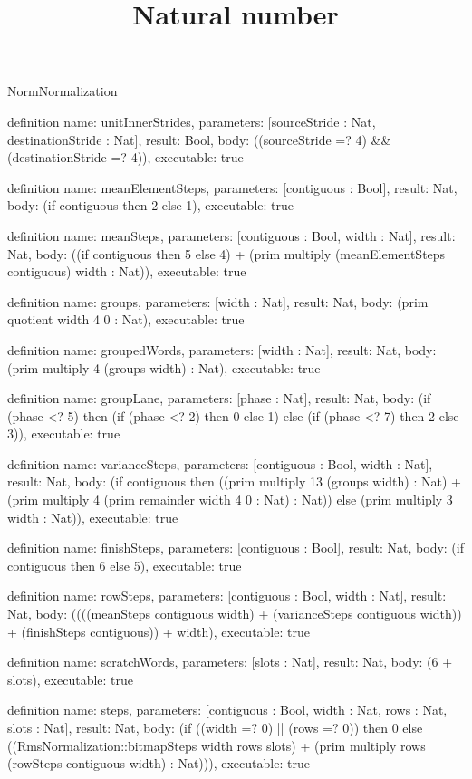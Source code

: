 \begin{lexlean}{NormNormalization}
\title{Natural number}
\begin{semanticmodule}
definition{
  name: unitInnerStrides,
  parameters: [sourceStride : Nat, destinationStride : Nat],
  result: Bool,
  body: ((sourceStride =? 4) && (destinationStride =? 4)),
  executable: true
}

definition{
  name: meanElementSteps,
  parameters: [contiguous : Bool],
  result: Nat,
  body: (if contiguous then 2 else 1),
  executable: true
}

definition{
  name: meanSteps,
  parameters: [contiguous : Bool, width : Nat],
  result: Nat,
  body: ((if contiguous then 5 else 4) + (prim multiply (meanElementSteps contiguous) width : Nat)),
  executable: true
}

definition{
  name: groups,
  parameters: [width : Nat],
  result: Nat,
  body: (prim quotient width 4 0 : Nat),
  executable: true
}

definition{
  name: groupedWords,
  parameters: [width : Nat],
  result: Nat,
  body: (prim multiply 4 (groups width) : Nat),
  executable: true
}

definition{
  name: groupLane,
  parameters: [phase : Nat],
  result: Nat,
  body: (if (phase <? 5) then (if (phase <? 2) then 0 else 1) else (if (phase <? 7) then 2 else 3)),
  executable: true
}

definition{
  name: varianceSteps,
  parameters: [contiguous : Bool, width : Nat],
  result: Nat,
  body: (if contiguous then ((prim multiply 13 (groups width) : Nat) + (prim multiply 4 (prim remainder width 4 0 : Nat) : Nat)) else (prim multiply 3 width : Nat)),
  executable: true
}

definition{
  name: finishSteps,
  parameters: [contiguous : Bool],
  result: Nat,
  body: (if contiguous then 6 else 5),
  executable: true
}

definition{
  name: rowSteps,
  parameters: [contiguous : Bool, width : Nat],
  result: Nat,
  body: ((((meanSteps contiguous width) + (varianceSteps contiguous width)) + (finishSteps contiguous)) + width),
  executable: true
}

definition{
  name: scratchWords,
  parameters: [slots : Nat],
  result: Nat,
  body: (6 + slots),
  executable: true
}

definition{
  name: steps,
  parameters: [contiguous : Bool, width : Nat, rows : Nat, slots : Nat],
  result: Nat,
  body: (if ((width =? 0) || (rows =? 0)) then 0 else ((RmsNormalization::bitmapSteps width rows slots) + (prim multiply rows (rowSteps contiguous width) : Nat))),
  executable: true
}


\end{semanticmodule}
\end{lexlean}
